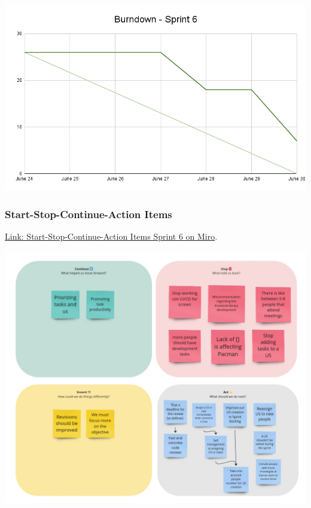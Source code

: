 \includegraphics[width=\textwidth]{./artifacts/src/sprint-6/assets/Burndown-Sprint6.png}

\hypertarget{startstopcontinueactionitems-s3}{
\subsubsection{Start-Stop-Continue-Action Items}\label{Start-Stop-Continue-Action Items S6}}
\href{https://miro.com/app/board/uXjVKDO7l8M=/?moveToWidget=3458764591631763576&cot=14}{Link: Start-Stop-Continue-Action Items Sprint 6 on Miro}.

\includegraphics[width=\textwidth]{./artifacts/src/sprint-6/assets/retrospective-s6.png}
